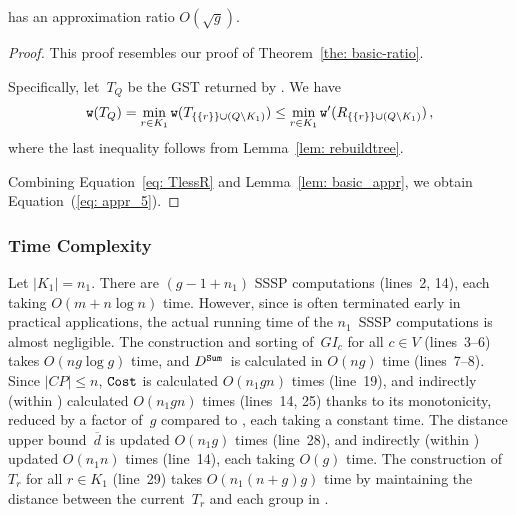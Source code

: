 \begin{theorem}
\label{the: impro_app}
\Improved has an approximation ratio $O(\sqrt{g})$.
\end{theorem}

\begin{proof}
    This proof resembles our proof of Theorem~\ref{the: basic-ratio}.
    
    Specifically, let~$T_Q$ be the GST returned by \Improved. We have
    \begin{gather}
    \label{eq: TlessR}
    \mathtt{w}(T_Q) = \min_{r\in K_1} \mathtt{w}(T_{\{\{r\}\}\cup (Q \setminus K_1)}) \leq \min_{r\in K_1} \mathtt{w}'(R_{\{\{r\}\}\cup(Q \setminus K_1)}) \,,
    \end{gather}
    \noindent where the last inequality follows from Lemma~\ref{lem: rebuildtree}.

    Combining Equation~\eqref{eq: TlessR} and Lemma~\ref{lem: basic_appr}, we obtain Equation~(\ref{eq: appr_5}).
\end{proof}

\subsubsection{Time Complexity}
\label{sec:improve-time}

Let $|K_1| = n_1$. There are $(g-1+n_1)$ SSSP computations (lines~2, 14), each taking $O(m+n\log{n})$ time. However, since \PartialDijkstra is often terminated early in practical applications, the actual running time of the $n_1$~SSSP computations is almost negligible. The construction and sorting of~$GI_c$ for all $c \in V$ (lines~3--6) takes $O(ng\log{g})$ time, and $D^{\texttt{Sum}}$~is calculated in $O(ng)$ time (lines~7--8).
Since $|CP| \leq n$, $\mathtt{Cost}$ is calculated $O(n_1gn)$ times (line~19), and indirectly (within \UpdateCandidate) calculated $O(n_1gn)$ times (lines~14, 25) thanks to its monotonicity, reduced by a factor of~$g$ compared to \Basic, each taking a constant time.
The distance upper bound~$\overline{d}$ is updated $O(n_1g)$ times (line~28), and indirectly (within \PartialDijkstra) updated $O(n_1n)$ times (line~14), each taking $O(g)$ time.
The construction of~$T_r$ for all $r \in K_1$ (line~29) takes $O(n_1(n+g)g)$ time by maintaining the distance between the current~$T_r$ and each group in \ConstructTree.


